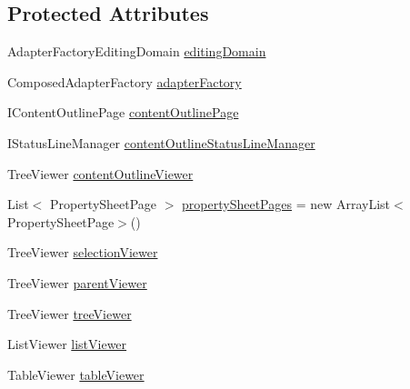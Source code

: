 \subsection*{Protected Attributes}
\begin{DoxyCompactItemize}
\item 
Adapter\-Factory\-Editing\-Domain \hyperlink{classshootingmachineemfmodel_1_1presentation_1_1_shootingmachineemfmodel_editor_a2e9e461c070672d140cec34e7b28a33f}{editing\-Domain}
\item 
Composed\-Adapter\-Factory \hyperlink{classshootingmachineemfmodel_1_1presentation_1_1_shootingmachineemfmodel_editor_a9b082c3598baf8cd6ce6b4f8af3d1e0c}{adapter\-Factory}
\item 
I\-Content\-Outline\-Page \hyperlink{classshootingmachineemfmodel_1_1presentation_1_1_shootingmachineemfmodel_editor_a769132f97a0f4f78180801019cfe3bfc}{content\-Outline\-Page}
\item 
I\-Status\-Line\-Manager \hyperlink{classshootingmachineemfmodel_1_1presentation_1_1_shootingmachineemfmodel_editor_a3fb1ea5e4d06021254e5274f65450e9e}{content\-Outline\-Status\-Line\-Manager}
\item 
Tree\-Viewer \hyperlink{classshootingmachineemfmodel_1_1presentation_1_1_shootingmachineemfmodel_editor_a439e5c9044414c12d0872c9375a557e7}{content\-Outline\-Viewer}
\item 
List$<$ Property\-Sheet\-Page $>$ \hyperlink{classshootingmachineemfmodel_1_1presentation_1_1_shootingmachineemfmodel_editor_a582ed985bfbd7a5df3ff81eab6d30172}{property\-Sheet\-Pages} = new Array\-List$<$Property\-Sheet\-Page$>$()
\item 
Tree\-Viewer \hyperlink{classshootingmachineemfmodel_1_1presentation_1_1_shootingmachineemfmodel_editor_a3523d857d193e1f6354d231f13ee9407}{selection\-Viewer}
\item 
Tree\-Viewer \hyperlink{classshootingmachineemfmodel_1_1presentation_1_1_shootingmachineemfmodel_editor_a51e68ebf3e9ae230b2e144a9ad94c955}{parent\-Viewer}
\item 
Tree\-Viewer \hyperlink{classshootingmachineemfmodel_1_1presentation_1_1_shootingmachineemfmodel_editor_a451c83523c3d5b93f77f69d72af9d811}{tree\-Viewer}
\item 
List\-Viewer \hyperlink{classshootingmachineemfmodel_1_1presentation_1_1_shootingmachineemfmodel_editor_a7e795c2feed14cb78a111857e5073881}{list\-Viewer}
\item 
Table\-Viewer \hyperlink{classshootingmachineemfmodel_1_1presentation_1_1_shootingmachineemfmodel_editor_abf98592a7b8f3d7e86e4845abe367745}{table\-Viewer}

\end{DoxyCompactItemize}

